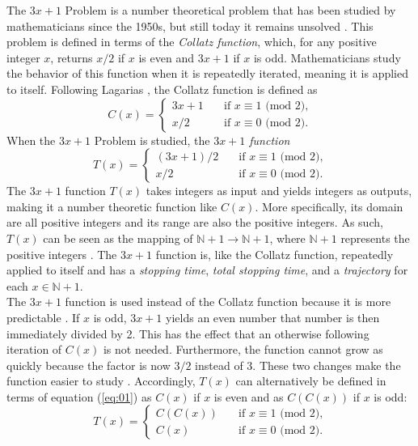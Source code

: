 \documentclass[12pt,a4paper,reqno]{amsart}
\begin{document}
The $3x+1$ Problem is a number theoretical problem that has been studied by 
mathematicians since the 1950s, but still
today it remains unsolved \cite{src:03}. This problem is defined in terms of
the \textit{Collatz function}, which, for any positive integer $x$, returns
$x/2$ if $x$ is even and $3x+1$ if $x$ is odd. Mathematicians study the
behavior of this function when it is repeatedly iterated, meaning it is applied
to itself. Following Lagarias \cite{src:03}, the Collatz function is defined as 
\begin{equation}
C(x)= \left\{
    \begin{array}{ll}
        3x+1 \quad &\text{if } x \equiv 1 \text{ (mod 2),} \\
        x/2 \quad &\text{if } x \equiv 0 \text{ (mod 2).}
    \end{array}
\right.
\label{eq:01}
\end{equation}
When the $3x+1$ Problem is studied, the \textit{$3x+1$ function} 
\begin{equation}
T(x)= \left\{
    \begin{array}{ll}
        (3x+1)/2 \quad &\text{if } x \equiv 1 \text{ (mod 2),} \\
        x/2 \quad &\text{if } x \equiv 0 \text{ (mod 2)}.
    \end{array}
\right.
\label{eq:02}
\end{equation}
The $3x+1$ function $T(x)$ 
takes integers as input and yields integers as outputs, making it a number
theoretic function like $C(x)$. More specifically, its
domain are all positive integers and its range are also the positive integers.
As such, $T(x)$ can be seen as the mapping of 
$\mathbb{N} + 1 \rightarrow \mathbb{N} + 1$, where $\mathbb{N} + 1$ represents
the positive integers \cite{src:04}. The $3x+1$ 
function is, like the Collatz function, repeatedly applied to itself and has 
a \textit{stopping time}, \textit{total stopping time}, and a 
\textit{trajectory} for each $x \in \mathbb{N} + 1$. \\
The $3x+1$ function is used instead of the Collatz function because it is more 
predictable \cite{src:03}. 
If $x$ is odd, $3x+1$ yields an even number that number is then 
immediately divided by 2. This has the effect that an otherwise following
iteration of $C(x)$ is not needed. Furthermore, the function cannot grow as
quickly because the factor is now $3/2$ instead of 3. These two changes make
the function easier to study \cite{src:03}.
Accordingly, $T(x)$ can alternatively be defined in terms of equation 
(\ref{eq:01}) as $C(x)$ if $x$ is even and as $C(C(x))$ if $x$ is odd:
\begin{equation}
T(x)= \left\{
\nonumber
    \begin{array}{ll}
        C(C(x))\quad &\text{if } x \equiv 1 \text{ (mod 2),} \\
        C(x) \quad &\text{if } x \equiv 0 \text{ (mod 2).}
    \end{array}
\right.
\label{eq:03}
\end{equation}
\end{document}
